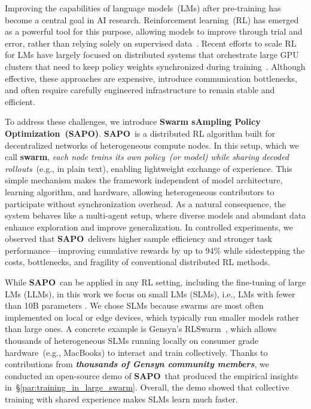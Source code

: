 \documentclass[11pt, a4paper, logo, singlecolumn, copyright]{gensyn}
\newcommand{\SAPO}{\textbf{SAPO}}
\begin{document}
Improving the capabilities of language models~(LMs) after pre-training has become a central goal in AI research. Reinforcement learning~(RL) has emerged as a powerful tool for this purpose, allowing models to improve through trial and error, rather than relying solely on supervised data~\citep{ziegler2020finetuninglanguagemodelshuman,openai2022instructionfollowing,openai2024learningtoreason,deepseekai2025deepseekr1incentivizingreasoningcapability}. Recent efforts to scale RL for LMs have largely focused on distributed systems that orchestrate large GPU clusters that need to keep policy weights synchronized during training~\citep{mistralai2025magistral,wu2025llamarldistributedasynchronousreinforcement,fu2025areallargescaleasynchronousreinforcement}. Although effective, these approaches are expensive, introduce communication bottlenecks, and often require carefully engineered infrastructure to remain stable and efficient.

To address these challenges, we introduce \textbf{Swarm sAmpling Policy Optimization~(SAPO)}.
\SAPO~is a distributed RL algorithm built for decentralized networks of heterogeneous compute nodes. In this setup, which we call \textbf{swarm}, \textit{each node trains its own policy~(or model) while sharing decoded rollouts}~(e.g., in plain text), enabling lightweight exchange of experience. 
This simple mechanism makes the framework independent of model architecture, learning algorithm, and hardware, allowing heterogeneous contributors to participate without synchronization overhead. As a natural consequence, the system behaves like a multi-agent setup, where diverse models and abundant data enhance exploration and improve generalization. In controlled experiments, we observed that \SAPO~delivers higher sample efficiency and stronger task performance---improving cumulative rewards by up to $94\%$ while sidestepping the costs, bottlenecks, and fragility of conventional distributed RL methods.

While \SAPO~can be applied in any RL setting, including the fine-tuning of large LMs (LLMs), in this work we focus on small LMs (SLMs), i.e., LMs with fewer than 10B parameters \citep{vannguyen2024surveysmalllanguagemodels}. We chose SLMs because swarms are most often implemented on local or edge devices, which typically run smaller models rather than large ones. A concrete example is Gensyn’s RLSwarm~\citep{gensyn2025rlswarm}, which allows thousands of heterogeneous SLMs running locally on consumer grade hardware~(e.g., MacBooks) to interact and train collectively. Thanks to contributions from \textbf{\textit{thousands of Gensyn community members}}, we conducted an open-source demo of \SAPO~that produced the empirical insights in~\S\ref{par:training_in_large_swarm}. Overall, the demo showed that collective training with shared experience makes SLMs learn much faster.
\end{document}
